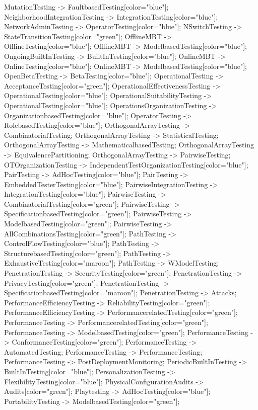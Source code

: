 \documentclass{article}
\begin{document}
{MutationTesting -> FaultbasedTesting[color="blue"];
NeighborhoodIntegrationTesting -> IntegrationTesting[color="blue"];
NetworkAdminTesting -> OperatorTesting[color="blue"];
NSwitchTesting -> StateTransitionTesting[color="green"];
OfflineMBT -> OfflineTesting[color="blue"];
OfflineMBT -> ModelbasedTesting[color="blue"];
OngoingBuiltInTesting -> BuiltInTesting[color="blue"];
OnlineMBT -> OnlineTesting[color="blue"];
OnlineMBT -> ModelbasedTesting[color="blue"];
OpenBetaTesting -> BetaTesting[color="blue"];
OperationalTesting -> AcceptanceTesting[color="green"];
OperationalEffectivenessTesting -> OperationalTesting[color="blue"];
OperationalSuitabilityTesting -> OperationalTesting[color="blue"];
OperationsOrganizationTesting -> OrganizationbasedTesting[color="blue"];
OperatorTesting -> RolebasedTesting[color="blue"];
OrthogonalArrayTesting -> CombinatorialTesting;
OrthogonalArrayTesting -> StatisticalTesting;
OrthogonalArrayTesting -> MathematicalbasedTesting;
OrthogonalArrayTesting -> EquivalencePartitioning;
OrthogonalArrayTesting -> PairwiseTesting;
OTOrganizationTesting -> IndependentTestOrganizationTesting[color="blue"];
PairTesting -> AdHocTesting[color="blue"];
PairTesting -> EmbeddedTesterTesting[color="blue"];
PairwiseIntegrationTesting -> IntegrationTesting[color="blue"];
PairwiseTesting -> CombinatorialTesting[color="green"];
PairwiseTesting -> SpecificationbasedTesting[color="green"];
PairwiseTesting -> ModelbasedTesting[color="green"];
PairwiseTesting -> AllCombinationsTesting[color="green"];
PathTesting -> ControlFlowTesting[color="blue"];
PathTesting -> StructurebasedTesting[color="green"];
PathTesting -> ExhaustiveTesting[color="maroon"];
PathTesting -> WModelTesting;
PenetrationTesting -> SecurityTesting[color="green"];
PenetrationTesting -> PrivacyTesting[color="green"];
PenetrationTesting -> SpecificationbasedTesting[color="maroon"];
PenetrationTesting -> Attacks;
PerformanceEfficiencyTesting -> ReliabilityTesting[color="green"];
PerformanceEfficiencyTesting -> PerformancerelatedTesting[color="green"];
PerformanceTesting -> PerformancerelatedTesting[color="green"];
PerformanceTesting -> ModelbasedTesting[color="green"];
PerformanceTesting -> ConformanceTesting[color="green"];
PerformanceTesting -> AutomatedTesting;
PerformanceTesting -> PerformanceTesting;
PerformanceTesting -> PostDeploymentMonitoring;
PeriodicBuiltInTesting -> BuiltInTesting[color="blue"];
PersonalizationTesting -> FlexibilityTesting[color="blue"];
PhysicalConfigurationAudits -> Audits[color="green"];
Playtesting -> AdHocTesting[color="blue"];
PortabilityTesting -> ModelbasedTesting[color="green"];
}
\end{document}

